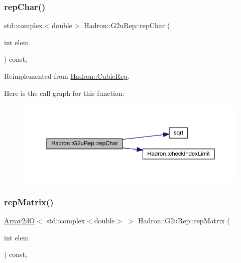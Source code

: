 \subsubsection{\texorpdfstring{repChar()}{repChar()}\hspace{0.1cm}{\footnotesize\ttfamily [2/2]}}
{\footnotesize\ttfamily std\+::complex$<$double$>$ Hadron\+::\+G2u\+Rep\+::rep\+Char (\begin{DoxyParamCaption}\item[{int}]{elem }\end{DoxyParamCaption}) const\hspace{0.3cm}{\ttfamily [inline]}, {\ttfamily [virtual]}}



Reimplemented from \mbox{\hyperlink{structHadron_1_1CubicRep_af45227106e8e715e84b0af69cd3b36f8}{Hadron\+::\+Cubic\+Rep}}.

Here is the call graph for this function\+:
\nopagebreak
\begin{figure}[H]
\begin{center}
\leavevmode
\includegraphics[width=350pt]{dc/dc0/structHadron_1_1G2uRep_a51ea6b7795e07c824b72dbefb7fb6ddb_cgraph}
\end{center}
\end{figure}
\mbox{\label{structHadron_1_1G2uRep_ac35dd43af2c4b6f32d9d3511b2500230}} 
\subsubsection{\texorpdfstring{repMatrix()}{repMatrix()}\hspace{0.1cm}{\footnotesize\ttfamily [1/2]}}
{\footnotesize\ttfamily \mbox{\hyperlink{classADAT_1_1Array2dO}{Array2dO}}$<$ std\+::complex$<$double$>$ $>$ Hadron\+::\+G2u\+Rep\+::rep\+Matrix (\begin{DoxyParamCaption}\item[{int}]{elem }\end{DoxyParamCaption}) const\hspace{0.3cm}{\ttfamily [inline]}, {\ttfamily [virtual]}}



